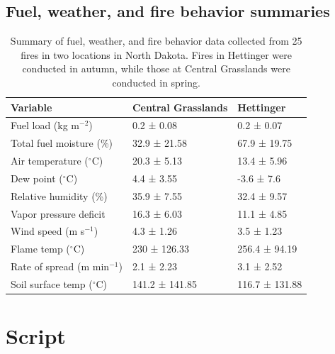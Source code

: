 \documentclass[
]{article}
\begin{document}
\hypertarget{fuel-weather-and-fire-behavior-summaries}{%
\subsection{Fuel, weather, and fire behavior
summaries}\label{fuel-weather-and-fire-behavior-summaries}}

\begin{table}[ht]
\centering
\begin{tabular}{lll}
  \hline
Variable & Central Grasslands & Hettinger \\ 
  \hline
Fuel load (kg m$^{-2}$) & 0.2 ± 0.08 & 0.2 ± 0.07 \\ 
  Total fuel moisture (\%) & 32.9 ± 21.58 & 67.9 ± 19.75 \\ 
  Air temperature ($^\circ$C) & 20.3 ± 5.13 & 13.4 ± 5.96 \\ 
  Dew point ($^\circ$C) & 4.4 ± 3.55 & -3.6 ± 7.6 \\ 
  Relative humidity (\%) & 35.9 ± 7.55 & 32.4 ± 9.57 \\ 
  Vapor pressure deficit & 16.3 ± 6.03 & 11.1 ± 4.85 \\ 
  Wind speed (m s$^{-1}$) & 4.3 ± 1.26 & 3.5 ± 1.23 \\ 
  Flame temp ($^\circ$C) & 230 ± 126.33 & 256.4 ± 94.19 \\ 
  Rate of spread (m min$^{-1}$) & 2.1 ± 2.23 & 3.1 ± 2.52 \\ 
  Soil surface temp ($^\circ$C) & 141.2 ± 141.85 & 116.7 ± 131.88 \\ 
   \hline
\end{tabular}
\caption{Summary of fuel, weather, and fire behavior data collected from 25 fires in two locations in North Dakota. Fires in Hettinger were conducted in autumn, while those at Central Grasslands were conducted in spring.} 
\end{table}

\clearpage

\hypertarget{script}{%
\section{Script}\label{script}}
\end{document}

